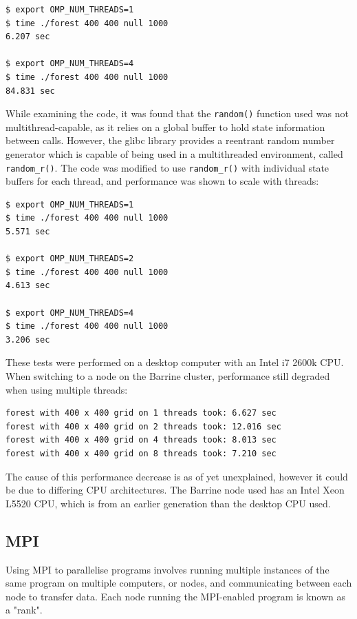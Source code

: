 \documentclass[11pt,a4paper]{report}
\begin{document}
\begin{verbatim}
$ export OMP_NUM_THREADS=1
$ time ./forest 400 400 null 1000
6.207 sec

$ export OMP_NUM_THREADS=4
$ time ./forest 400 400 null 1000
84.831 sec
\end{verbatim}

While examining the code, it was found that the \texttt{random()} function
used was not multithread-capable, as it relies on a global buffer to hold state
information between calls. However, the glibc library provides a reentrant random number
generator which is capable of being used in a multithreaded environment, called
\texttt{random\_r()}. The code was modified to use \texttt{random\_r()} with
individual state buffers for each thread, and performance was shown to scale
with threads:

\begin{verbatim}
$ export OMP_NUM_THREADS=1
$ time ./forest 400 400 null 1000
5.571 sec

$ export OMP_NUM_THREADS=2
$ time ./forest 400 400 null 1000
4.613 sec

$ export OMP_NUM_THREADS=4
$ time ./forest 400 400 null 1000
3.206 sec
\end{verbatim}

These tests were performed on a desktop computer with an Intel i7 2600k CPU.
When switching to a node on the Barrine cluster, performance still degraded
when using multiple threads:

\begin{verbatim}
forest with 400 x 400 grid on 1 threads took: 6.627 sec
forest with 400 x 400 grid on 2 threads took: 12.016 sec
forest with 400 x 400 grid on 4 threads took: 8.013 sec
forest with 400 x 400 grid on 8 threads took: 7.210 sec
\end{verbatim}

The cause of this performance decrease is as of yet unexplained, however it
could be due to differing CPU architectures. The Barrine node used has an Intel
Xeon L5520 CPU, which is from an earlier generation than the desktop CPU used.


\subsection{MPI}

Using MPI to parallelise programs involves running multiple instances of the
same program on multiple computers, or nodes, and communicating between each
node to transfer data. Each node running the MPI-enabled program is known as a
"rank".
\end{document}
